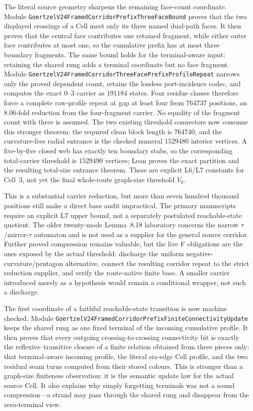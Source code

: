\documentclass[11pt]{article}
\theoremstyle{definition}
\begin{document}
The literal source geometry sharpens the remaining face-count coordinate.
Module
\texttt{GoertzelV24FramedCorridorPrefixThreeFaceBound} proves that the two
displayed crossings of a Cell meet only its three named dual-path faces.  It
then proves that the central face contributes one retained fragment, while
either outer face contributes at most one, so the cumulative prefix has at
most three boundary fragments.  The same bound holds for the terminal-aware
input: retaining the shared rung adds a terminal coordinate but no face
fragment.  Module
\texttt{GoertzelV24FramedCorridorThreeFacePrefixProfileRepeat} narrows only
the proved dependent count, retains the lossless port-incidence codec, and
computes the exact $0$--$3$ carrier as $191184$ states.  Four residue classes
therefore force a complete raw-profile repeat at gap at least four from
$764737$ positions, an $8.06$-fold reduction from the four-fragment carrier.
No equality of the fragment count with three is assumed.  The two existing
threshold connectors now consume this stronger theorem: the required clean
block length is $764740$, and the curvature-free radial entrance is the
checked numeral $1529480$ interior vertices.  A five-by-five closed web has
exactly ten boundary stubs, so the corresponding total-carrier threshold is
$1529490$ vertices; Lean proves the exact partition and the resulting
total-size entrance theorem.  These are explicit L6/L7 constants for Cell~3,
not yet the final whole-route graph-size threshold $V_0$.

This is a substantial carrier reduction, but more than seven hundred thousand
positions still make a direct base audit impractical.  The primary manuscripts require
an explicit L7 upper bound, not a separately postulated reachable-state
quotient.  The older twenty-mode Lemma~8.18 laboratory concerns the narrow
$\tau$/mirror-$\tau$ automaton and is not used as a supplier for the general
source corridor.  Further proved compression remains valuable, but the live
F obligations are the ones exposed by the actual threshold: discharge the
uniform negative-curvature/pentagon alternative, connect the resulting
corridor repeat to the strict reduction supplier, and verify the route-native
finite base.  A smaller carrier introduced merely as a hypothesis would remain
a conditional wrapper, not such a discharge.

The first coordinate of a faithful reachable-state transition is now
machine checked.  Module
\texttt{GoertzelV24FramedCorridorPrefixFiniteConnectivityUpdate} keeps the
shared rung as one fixed terminal of the incoming cumulative profile.  It
then proves that every outgoing crossing-to-crossing connectivity bit is
exactly the reflexive--transitive closure of a finite relation obtained from
three pieces only: that terminal-aware incoming profile, the literal
six-edge Cell profile, and the two residual seam turns computed from their
stored colours.  This is stronger than a graph-size finiteness observation:
it is the semantic update law for the actual source Cell.  It also explains
why simply forgetting terminals was not a sound compression---a strand may
pass through the shared rung and disappear from the zero-terminal view.
\end{document}
